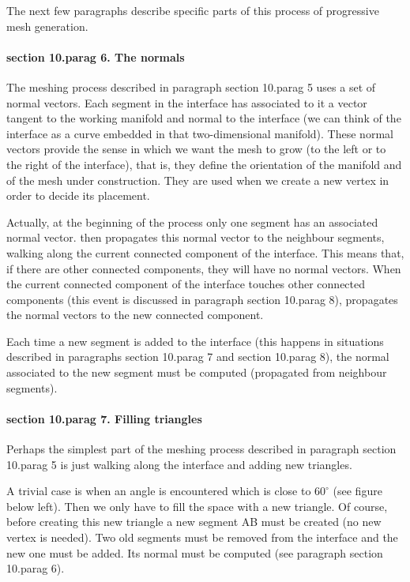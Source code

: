 {The next few paragraphs describe specific parts of this process of progressive mesh generation.


\paragraph{\numb section 10.\numb parag 6. The normals}

The meshing process described in paragraph \numb section 10.\numb parag 5 uses a set of
normal vectors.
Each segment in the interface has associated to it
a vector tangent to the working manifold and normal to the interface (we can
think of the interface as a curve embedded in that two-dimensional manifold).
These normal vectors provide the sense in which we want the mesh to grow (to the left or to
the right of the interface), that is, they define the orientation of the manifold and of
the mesh under construction.
They are used when we create a new vertex in order to decide its placement.

Actually, at the beginning of the process only one segment has an associated normal vector.
{\ManiFEM} then propagates this normal vector to the neighbour segments, walking along
the current connected component of the interface.
This means that, if there are other connected components, they will have no normal vectors.
When the current connected component of the interface touches other connected components
(this event is discussed in paragraph \numb section 10.\numb parag 8), {\maniFEM}
propagates the normal vectors to the new connected component.

Each time a new segment is added to the interface (this happens in situations described in
paragraphs \numb section 10.\numb parag 7 and \numb section 10.\numb parag 8),
the normal associated to the new segment must be computed (propagated from neighbour
segments).
\vfil\eject


\paragraph{\numb section 10.\numb parag 7. Filling triangles}

Perhaps the simplest part of the meshing process described in paragraph
\numb section 10.\numb parag 5 is just walking along the interface and adding new triangles.

A trivial case is when an angle is encountered which is close to $ 60^\circ $
(see figure below left).
Then we only have to fill the space with a new triangle.
Of course, before creating this new triangle a new segment {\codett AB} must be created
(no new vertex is needed).
Two old segments must be removed from the interface and the new one must be added.
Its normal must be computed (see paragraph \numb section 10.\numb parag 6).

}
